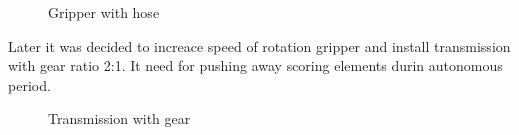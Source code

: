 	\begin{figure}[H]
		\begin{minipage}[h]{\linewidth}
			\caption{Gripper with hose}
		\end{minipage}
	\end{figure}
	Later it was decided to increace speed of rotation gripper and install transmission with gear ratio 2:1. It need for pushing away scoring elements durin autonomous period.
   \begin{figure}[H]
		\begin{minipage}[h]{\linewidth}
			\caption{Transmission with gear}
		\end{minipage}
	\end{figure}   
